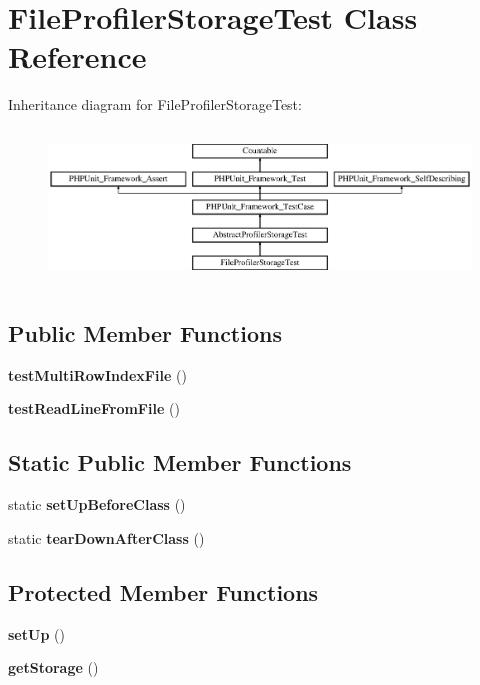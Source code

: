 \section{File\+Profiler\+Storage\+Test Class Reference}
\label{class_symfony_1_1_component_1_1_http_kernel_1_1_tests_1_1_profiler_1_1_file_profiler_storage_test}
Inheritance diagram for File\+Profiler\+Storage\+Test\+:\begin{figure}[H]
\begin{center}
\leavevmode
\includegraphics[height=4.129793cm]{class_symfony_1_1_component_1_1_http_kernel_1_1_tests_1_1_profiler_1_1_file_profiler_storage_test}
\end{center}
\end{figure}
\subsection*{Public Member Functions}
\begin{DoxyCompactItemize}
\item 
{\bf test\+Multi\+Row\+Index\+File} ()
\item 
{\bf test\+Read\+Line\+From\+File} ()
\end{DoxyCompactItemize}
\subsection*{Static Public Member Functions}
\begin{DoxyCompactItemize}
\item 
static {\bf set\+Up\+Before\+Class} ()
\item 
static {\bf tear\+Down\+After\+Class} ()
\end{DoxyCompactItemize}
\subsection*{Protected Member Functions}
\begin{DoxyCompactItemize}
\item 
{\bf set\+Up} ()
\item 
{\bf get\+Storage} ()
\end{DoxyCompactItemize}
